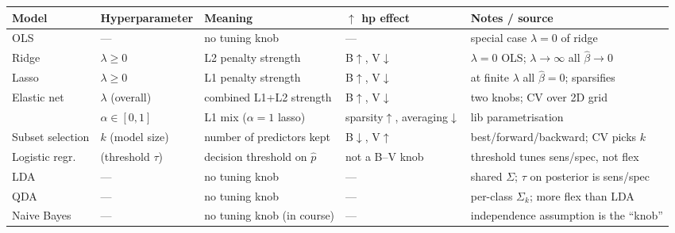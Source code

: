 {\onecolumn
\begin{center}
\scriptsize
\renewcommand{\arraystretch}{1.05}
\begin{tabular*}{\textwidth}{@{\extracolsep{\fill}} l l l l l @{}}
\toprule
\textbf{Model} & \textbf{Hyperparameter} & \textbf{Meaning} & \textbf{$\uparrow$ hp effect} & \textbf{Notes / source} \\
\midrule

OLS                & ---                 & no tuning knob               & ---                                  & special case $\lambda{=}0$ of ridge \\
\midrule

Ridge              & $\lambda \geq 0$    & L2 penalty strength          & B$\uparrow$, V$\downarrow$           & $\lambda{=}0$ OLS; $\lambda{\to}\infty$ all $\hat\beta{\to}0$ \\
\midrule

Lasso              & $\lambda \geq 0$    & L1 penalty strength          & B$\uparrow$, V$\downarrow$           & at finite $\lambda$ all $\hat\beta{=}0$; sparsifies \\
\midrule

\multirow{2}{*}{Elastic net}
                   & $\lambda$ (overall) & combined L1{+}L2 strength    & B$\uparrow$, V$\downarrow$           & two knobs; CV over 2D grid \\
                   & $\alpha\in[0,1]$    & L1 mix ($\alpha{=}1$ lasso)  & sparsity$\uparrow$, averaging$\downarrow$ & lib parametrisation \\
\midrule

Subset selection   & $k$ (model size)    & number of predictors kept   & B$\downarrow$, V$\uparrow$           & best/forward/backward; CV picks $k$ \\
\midrule

Logistic regr.     & (threshold $\tau$)  & decision threshold on $\hat p$ & not a B--V knob                    & threshold tunes sens/spec, not flex \\
\midrule

LDA                & ---                 & no tuning knob               & ---                                  & shared $\Sigma$; $\tau$ on posterior is sens/spec \\
QDA                & ---                 & no tuning knob               & ---                                  & per-class $\Sigma_k$; more flex than LDA \\
Naive Bayes        & ---                 & no tuning knob (in course)   & ---                                  & independence assumption is the ``knob'' \\
\midrule


\end{tabular*}
\end{center}}
